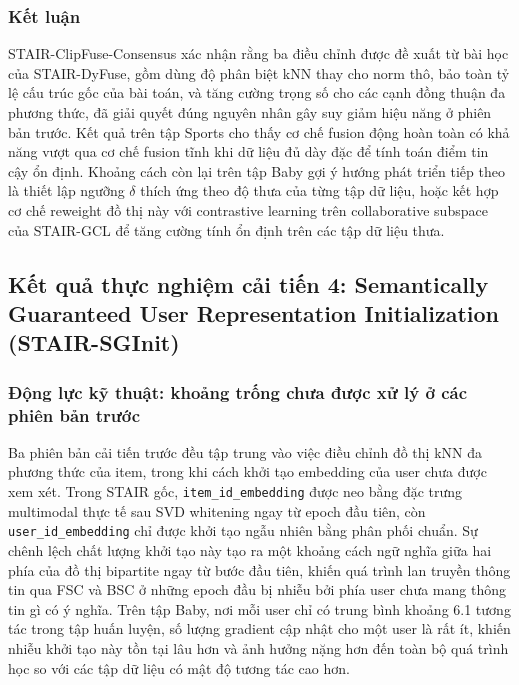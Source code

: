 \begin{longtable}
\subsubsection{Kết luận}
 
STAIR-ClipFuse-Consensus xác nhận rằng ba điều chỉnh được đề xuất từ bài học của STAIR-DyFuse, gồm dùng độ phân biệt kNN thay cho norm thô, bảo toàn tỷ lệ cấu trúc gốc của bài toán, và tăng cường trọng số cho các cạnh đồng thuận đa phương thức, đã giải quyết đúng nguyên nhân gây suy giảm hiệu năng ở phiên bản trước. Kết quả trên tập Sports cho thấy cơ chế fusion động hoàn toàn có khả năng vượt qua cơ chế fusion tĩnh khi dữ liệu đủ dày đặc để tính toán điểm tin cậy ổn định. Khoảng cách còn lại trên tập Baby gợi ý hướng phát triển tiếp theo là thiết lập ngưỡng $\delta$ thích ứng theo độ thưa của từng tập dữ liệu, hoặc kết hợp cơ chế reweight đồ thị này với contrastive learning trên collaborative subspace của STAIR-GCL để tăng cường tính ổn định trên các tập dữ liệu thưa.
 
 
 
 
\subsection{Kết quả thực nghiệm cải tiến 4: Semantically Guaranteed User Representation Initialization (STAIR-SGInit)}
 
\subsubsection{Động lực kỹ thuật: khoảng trống chưa được xử lý ở các phiên bản trước}
 
Ba phiên bản cải tiến trước đều tập trung vào việc điều chỉnh đồ thị kNN đa phương thức của item, trong khi cách khởi tạo embedding của user chưa được xem xét. Trong STAIR gốc, \texttt{item\_id\_embedding} được neo bằng đặc trưng multimodal thực tế sau SVD whitening ngay từ epoch đầu tiên, còn \texttt{user\_id\_embedding} chỉ được khởi tạo ngẫu nhiên bằng phân phối chuẩn. Sự chênh lệch chất lượng khởi tạo này tạo ra một khoảng cách ngữ nghĩa giữa hai phía của đồ thị bipartite ngay từ bước đầu tiên, khiến quá trình lan truyền thông tin qua FSC và BSC ở những epoch đầu bị nhiễu bởi phía user chưa mang thông tin gì có ý nghĩa. Trên tập Baby, nơi mỗi user chỉ có trung bình khoảng 6.1 tương tác trong tập huấn luyện, số lượng gradient cập nhật cho một user là rất ít, khiến nhiễu khởi tạo này tồn tại lâu hơn và ảnh hưởng nặng hơn đến toàn bộ quá trình học so với các tập dữ liệu có mật độ tương tác cao hơn.
 

\end{longtable}
